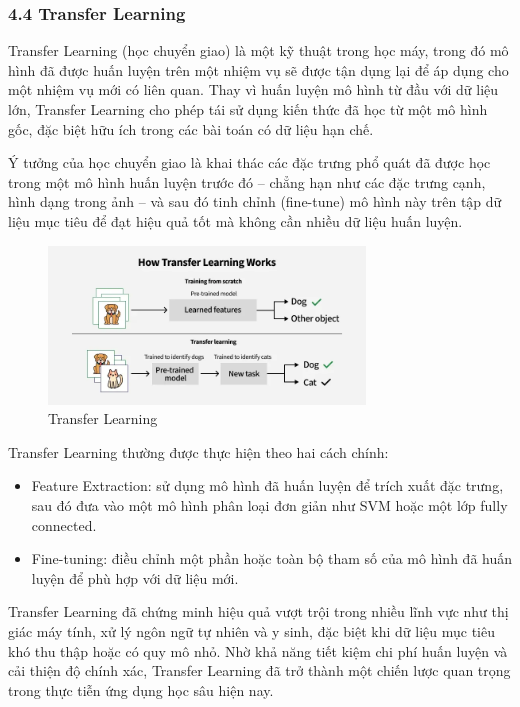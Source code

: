 \documentclass[../main.tex]{subfiles}
\begin{document}
\subsubsection*{4.4 Transfer Learning}

Transfer Learning (học chuyển giao) là một kỹ thuật trong học máy, trong đó mô hình đã được huấn luyện trên một nhiệm vụ sẽ được tận dụng lại để áp dụng cho một nhiệm vụ mới có liên quan. Thay vì huấn luyện mô hình từ đầu với dữ liệu lớn, Transfer Learning cho phép tái sử dụng kiến thức đã học từ một mô hình gốc, đặc biệt hữu ích trong các bài toán có dữ liệu hạn chế.

Ý tưởng của học chuyển giao là khai thác các đặc trưng phổ quát đã được học trong một mô hình huấn luyện trước đó – chẳng hạn như các đặc trưng cạnh, hình dạng trong ảnh – và sau đó tinh chỉnh (fine-tune) mô hình này trên tập dữ liệu mục tiêu để đạt hiệu quả tốt mà không cần nhiều dữ liệu huấn luyện.

\begin{figure}[H]
    \centering
    \includegraphics[width=0.75\textwidth]{Image/transfer-learning.png}
    \caption{Transfer Learning}
    \label{fig:Transfer Learning}
\end{figure}

Transfer Learning thường được thực hiện theo hai cách chính:

\begin{itemize}
    \item Feature Extraction: sử dụng mô hình đã huấn luyện để trích xuất đặc trưng, sau đó đưa vào một mô hình phân loại đơn giản như SVM hoặc một lớp fully connected.
    \item Fine-tuning: điều chỉnh một phần hoặc toàn bộ tham số của mô hình đã huấn luyện để phù hợp với dữ liệu mới.
\end{itemize}

Transfer Learning đã chứng minh hiệu quả vượt trội trong nhiều lĩnh vực như thị giác máy tính, xử lý ngôn ngữ tự nhiên và y sinh, đặc biệt khi dữ liệu mục tiêu khó thu thập hoặc có quy mô nhỏ. Nhờ khả năng tiết kiệm chi phí huấn luyện và cải thiện độ chính xác, Transfer Learning đã trở thành một chiến lược quan trọng trong thực tiễn ứng dụng học sâu hiện nay.
\end{document}
